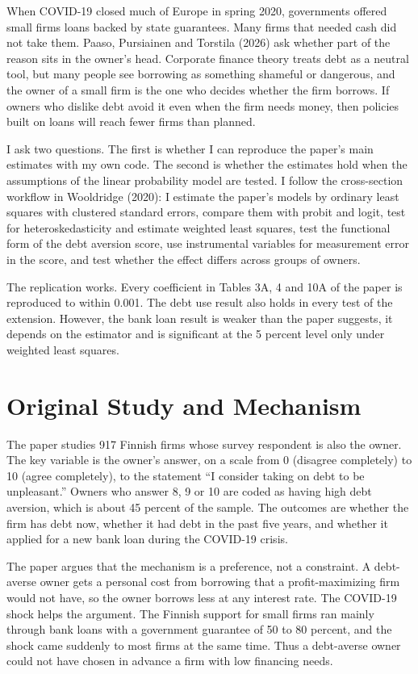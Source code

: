 \documentclass[preprint,letterpaper,11pt,authoryear]{elsarticle}
\begin{document}
When COVID-19 closed much of Europe in spring 2020, governments offered small firms loans backed by state guarantees. Many firms that needed cash did not take them. Paaso, Pursiainen and Torstila (2026) ask whether part of the reason sits in the owner's head. Corporate finance theory treats debt as a neutral tool, but many people see borrowing as something shameful or dangerous, and the owner of a small firm is the one who decides whether the firm borrows. If owners who dislike debt avoid it even when the firm needs money, then policies built on loans will reach fewer firms than planned.

I ask two questions. The first is whether I can reproduce the paper's main estimates with my own code. The second is whether the estimates hold when the assumptions of the linear probability model are tested. I follow the cross-section workflow in Wooldridge (2020): I estimate the paper's models by ordinary least squares with clustered standard errors, compare them with probit and logit, test for heteroskedasticity and estimate weighted least squares, test the functional form of the debt aversion score, use instrumental variables for measurement error in the score, and test whether the effect differs across groups of owners.

The replication works. Every coefficient in Tables 3A, 4 and 10A of the paper is reproduced to within 0.001. The debt use result also holds in every test of the extension. However, the bank loan result is weaker than the paper suggests, it depends on the estimator and is significant at the 5 percent level only under weighted least squares.

\section{Original Study and Mechanism}

The paper studies 917 Finnish firms whose survey respondent is also the owner. The key variable is the owner's answer, on a scale from 0 (disagree completely) to 10 (agree completely), to the statement ``I consider taking on debt to be unpleasant.'' Owners who answer 8, 9 or 10 are coded as having high debt aversion, which is about 45 percent of the sample. The outcomes are whether the firm has debt now, whether it had debt in the past five years, and whether it applied for a new bank loan during the COVID-19 crisis.

The paper argues that the mechanism is a preference, not a constraint. A debt-averse owner gets a personal cost from borrowing that a profit-maximizing firm would not have, so the owner borrows less at any interest rate. The COVID-19 shock helps the argument. The Finnish support for small firms ran mainly through bank loans with a government guarantee of 50 to 80 percent, and the shock came suddenly to most firms at the same time. Thus a debt-averse owner could not have chosen in advance a firm with low financing needs.
\end{document}
